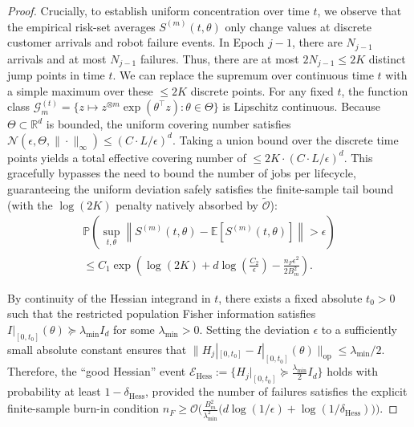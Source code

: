 \documentclass[letterpaper, 10 pt, conference]{IEEEconf}
\begin{document}
\begin{proof}
    Crucially, to establish uniform concentration over time $t$, we observe that the empirical risk-set averages $S^{(m)}(t, \theta)$ only change values at discrete customer arrivals and robot failure events. In Epoch $j-1$, there are $N_{j-1}$ arrivals and at most $N_{j-1}$ failures. Thus, there are at most $2N_{j-1} \le 2K$ distinct jump points in time $t$. We can replace the supremum over continuous time $t$ with a simple maximum over these $\le 2K$ discrete points. For any fixed $t$, the function class $\mathcal{G}_m^{(t)} = \{ z \mapsto z^{\otimes m} \exp(\theta^\top z) : \theta \in \Theta \}$ is Lipschitz continuous. Because $\Theta \subset \mathbb{R}^d$ is bounded, the uniform covering number satisfies $\mathcal{N}(\epsilon, \Theta, \|\cdot\|_\infty) \le (C \cdot L / \epsilon)^d$. Taking a union bound over the discrete time points yields a total effective covering number of $\le 2K \cdot (C \cdot L / \epsilon)^d$. This gracefully bypasses the need to bound the number of jobs per lifecycle, guaranteeing the uniform deviation safely satisfies the finite-sample tail bound (with the $\log(2K)$ penalty natively absorbed by $\widetilde{\mathcal{O}}$):
    \begin{multline}
        \mathbb{P}\left( \sup_{t, \theta} \left\| S^{(m)}(t, \theta) - \mathbb{E}[S^{(m)}(t, \theta)] \right\| > \epsilon \right) \\
        \le C_1 \exp\left( \log(2K) + d \log\left(\frac{C_2}{\epsilon}\right) - \frac{n_F \epsilon^2}{2 B_m^2} \right).
    \end{multline}

    By continuity of the Hessian integrand in $t$, there exists a fixed absolute $t_0 > 0$ such that the restricted population Fisher information satisfies $I|_{[0, t_0]}(\theta) \succeq \lambda_{\min} I_d$ for some $\lambda_{\min} > 0$. Setting the deviation $\epsilon$ to a sufficiently small absolute constant ensures that $\|H_j|_{[0, t_0]} - I|_{[0, t_0]}(\theta)\|_{\mathrm{op}} \le \lambda_{\min}/2$. Therefore, the ``good Hessian'' event $\mathcal{E}_{\mathrm{Hess}} := \{ H_j|_{[0, t_0]} \succeq \frac{\lambda_{\min}}{2} I_d \}$ holds with probability at least $1 - \delta_{\mathrm{Hess}}$, provided the number of failures satisfies the explicit finite-sample burn-in condition $n_F \ge \mathcal{O}\big( \frac{B_m^2}{\lambda_{\min}^2} \big( d \log(1/\epsilon) + \log(1/\delta_{\mathrm{Hess}}) \big) \big)$.


\end{proof}
\end{document}
